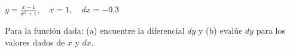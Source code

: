 \item $\displaystyle y = \frac{x - 1}{x^2 + 1}, \quad x = 1, \quad dx = -0.3$
\par
Para la función dada: (a) encuentre la diferencial $dy$ y (b) evalúe $dy$ para los valores dados de $x$ y $dx$.
